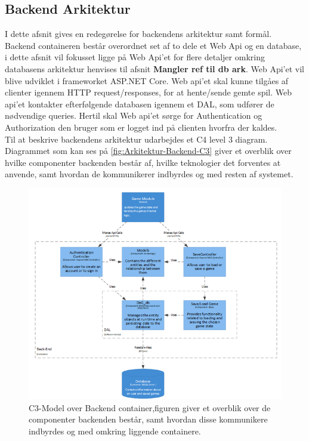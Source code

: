 \subsection{Backend Arkitektur}
\label{ssec: BackendArkitektur}
I dette afsnit gives en redegørelse for backendens arkitektur samt formål.\\ 
 
\noindent Backend containeren består overordnet set af to dele et Web Api og en database, i dette afsnit vil fokusset ligge på Web Api'et for flere detaljer omkring databasens arkitektur henvises til afsnit \textbf{Mangler ref til db ark}. Web Api'et vil blive udviklet i frameworket ASP.NET Core. Web api'et skal kunne tilgåes af clienter igennem HTTP request/responses, for at hente/sende gemte spil. Web api'et kontakter efterfølgende databasen igennem et DAL, som udfører de nødvendige queries. Hertil skal Web api'et sørge for Authentication og Authorization den bruger som er logget ind på clienten hvorfra der kaldes. \\

\noindent Til at beskrive backendens arkitektur udarbejdes et C4 level 3 diagram. Diagrammet som kan ses på \autoref{fig:Arkitektur-Backend-C3} giver et overblik over hvilke componenter backenden består af, hvilke teknologier det forventes at anvende, samt hvordan de kommunikerer indbyrdes og med resten af systemet.\\

 
\begin{figure}[H]
\centering
\includegraphics[width = \textwidth]{02-Body/Images/Backend_C3.PNG}
\caption{C3-Model over Backend container,figuren giver et overblik over de componenter backenden består, samt hvordan disse kommunikere indbyrdes og med omkring liggende containere.}
\label{fig:Arkitektur-Backend-C3}
\end{figure}

